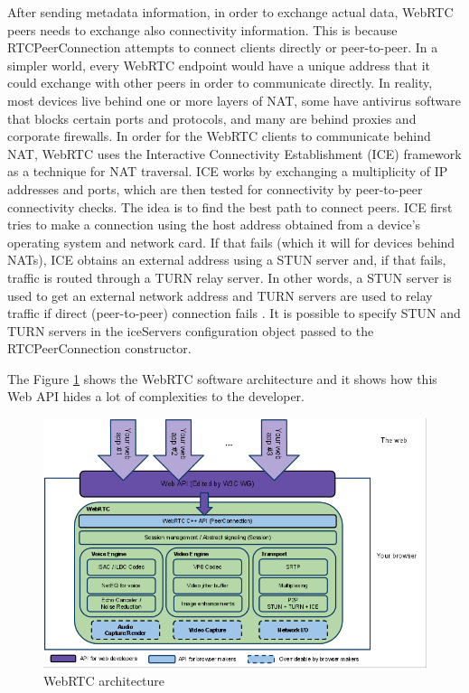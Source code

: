 \documentclass[../main.tex]{subfiles}
\begin{document}
After sending metadata information, in order to exchange actual data, WebRTC peers needs to exchange also connectivity information. This is because RTCPeerConnection attempts to connect clients directly or peer-to-peer. In a simpler world, every WebRTC endpoint would have a unique address that it could exchange with other peers in order to communicate directly. In reality, most devices live behind one or more layers of NAT, some have antivirus software that blocks certain ports and protocols, and many are behind proxies and corporate firewalls. In order for the WebRTC clients to communicate behind NAT, WebRTC uses the Interactive Connectivity Establishment (ICE) framework as a technique for NAT traversal. ICE works by exchanging a multiplicity of IP addresses and ports, which are then tested for connectivity by peer-to-peer connectivity checks. The idea is to find the best path to connect peers. ICE first tries to make a connection using the host address obtained from a device's operating system and network card. If that fails (which it will for devices behind NATs), ICE obtains an external address using a STUN server and, if that fails, traffic is routed through a TURN relay server. In other words, a STUN server is used to get an external network address and TURN servers are used to relay traffic if direct (peer-to-peer) connection fails \cite{STUN_TURN}. It is possible to specify STUN and TURN servers in the iceServers configuration object passed to the RTCPeerConnection constructor. 

The Figure \ref{fig:webrtc architecture} shows the WebRTC software architecture and it shows how this Web API hides a lot of complexities to the developer. 

\begin{figure}[ht]
    \centering
    \includegraphics[width=\textwidth]{images/WebRTC architecture.png}
    \caption{WebRTC architecture \cite{WebRTC_architecture}}
    \label{fig:webrtc architecture}
\end{figure}
\end{document}
